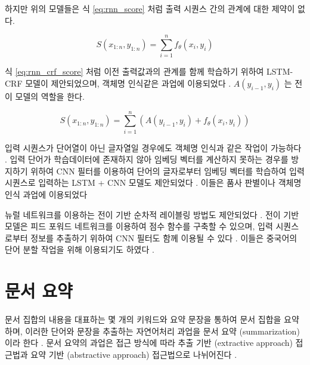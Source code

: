 \documentclass[oneside, ko,phd]{snuthesis_utf8_kor}
\begin{document}
하지만 위의 모델들은 식 \ref{eq:rnn_score} 처럼 출력 시퀀스 간의 관계에 대한 제약이 없다.

\begin{equation}
  \label{eq:rnn_score}
  S(x_{1:n}, y_{1:n}) = \sum_{i=1}^n f_\theta(x_i, y_i)
\end{equation}

식 \ref{eq:rnn_crf_score} 처럼 이전 출력값과의 관계를 함께 학습하기 위하여 LSTM-CRF 모델이 제안되었으며, 객체명 인식같은 과업에 이용되었다 \cite{lample2016neural}.
$A(y_{i-1}, y_i)$ 는 전이 모델의 역할을 한다.

\begin{equation}
  \label{eq:rnn_crf_score}
  S(x_{1:n}, y_{1:n}) = \sum_{i=1}^n \left( A(y_{i-1}, y_i) + f_\theta(x_i, y_i) \right)
\end{equation}

입력 시퀀스가 단어열이 아닌 글자열일 경우에도 객체명 인식과 같은 작업이 가능하다 \cite{gridach2017character}.
입력 단어가 학습데이터에 존재하지 않아 임베딩 벡터를 계산하지 못하는 경우를 방지하기 위하여 CNN 필터를 이용하여 단어의 글자로부터 임베딩 벡터를 학습하여 입력 시퀀스로 입력하는 LSTM + CNN 모델도 제안되었다 \cite{chiu2016named}.
이들은 품사 판별이나 객체명 인식 과업에 이용되었다 \cite{ma2016end, santos2014learning}

뉴럴 네트워크를 이용하는 전이 기반 순차적 레이블링 방법도 제안되었다 \cite{zheng2013deep, collobert2011natural, alberti2015improved}.
전이 기반 모델은 피드 포워드 네트워크를 이용하여 점수 함수를 구축할 수 있으며, 입력 시퀀스로부터 정보를 추출하기 위하여 CNN 필터도 함께 이용될 수 있다 \cite{collobert2011natural}.
이들은 중국어의 단어 분할 작업을 위해 이용되기도 하였다 \cite{zhang2016transition, cai2017fast, ballesteros2015improved}.


\section{문서 요약}

문서 집합의 내용을 대표하는 몇 개의 키워드와 요약 문장을 통하여 문서 집합을 요약하며, 이러한 단어와 문장을 추출하는 자연어처리 과업을 문서 요약 (summarization) 이라 한다 \cite{yao2017recent}.
문서 요약의 과업은 접근 방식에 따라 추출 기반 (extractive approach) 접근법과 요약 기반 (abstractive approach) 접근법으로 나뉘어진다 \cite{yao2017recent}.
\end{document}
